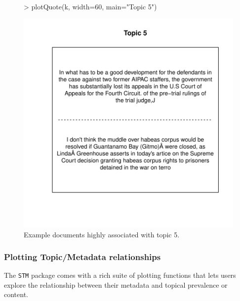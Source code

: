\documentclass[nojss]{jss}
\begin{document}
\begin{Schunk}
\end{Schunk}

\begin{figure}[t!]
\begin{center}
\begin{Schunk}
\begin{Sinput}
> plotQuote(k, width=60, main="Topic 5")
\end{Sinput}
\end{Schunk}
\includegraphics{stmVignette-012}
\caption{Example documents highly associated with topic 5.}
\label{fig:example}
\end{center}
\end{figure}



\subsubsection{Plotting Topic/Metadata relationships}

The \texttt{STM} package comes with a rich suite of plotting functions that lets users explore the relationship between their metadata and topical prevalence or content.
\end{document}
